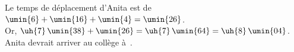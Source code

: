    Le temps de déplacement d'Anita est de \\
   $\umin{6}+\umin{16}+\umin{4} =\umin{26}$. \\
   Or, $\uh{7}\,\umin{38}+\umin{26} =\uh{7}\,\umin{64} =\uh{8}\,\umin{04}$. \\
   {\blue Anita devrait arriver au collège à \,}. \\
